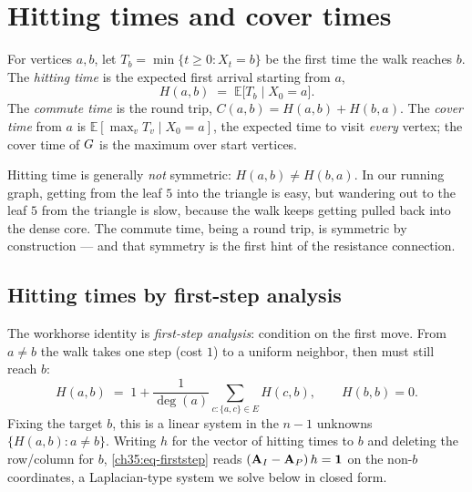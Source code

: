 \section{Hitting times and cover times}

\begin{definition}\label{ch35:def-hitting}
For vertices $a,b$, let $T_b=\min\{t\ge 0: X_t=b\}$ be the first time the walk reaches $b$. The \emph{hitting time} is the expected first arrival starting from $a$,
\[
  H(a,b)\;=\;\mathbb{E}\big[T_b \mid X_0=a\big].
\]
The \emph{commute time} is the round trip, $C(a,b)=H(a,b)+H(b,a)$. The \emph{cover time} from $a$ is $\mathbb{E}[\max_{v}T_v\mid X_0=a]$, the expected time to visit \emph{every} vertex; the cover time of $G$ is the maximum over start vertices.
\end{definition}

Hitting time is generally \emph{not} symmetric: $H(a,b)\ne H(b,a)$. In our running graph, getting from the leaf $5$ into the triangle is easy, but wandering out to the leaf $5$ from the triangle is slow, because the walk keeps getting pulled back into the dense core. The commute time, being a round trip, is symmetric by construction --- and that symmetry is the first hint of the resistance connection.

\subsection{Hitting times by first-step analysis}

The workhorse identity is \emph{first-step analysis}: condition on the first move. From $a\ne b$ the walk takes one step (cost $1$) to a uniform neighbor, then must still reach $b$:
\begin{equation}\label{ch35:eq-firststep}
  H(a,b) \;=\; 1+\frac{1}{\deg(a)}\sum_{c:\{a,c\}\in E} H(c,b),
  \qquad H(b,b)=0.
\end{equation}
Fixing the target $b$, this is a linear system in the $n-1$ unknowns $\{H(a,b):a\ne b\}$. Writing $h$ for the vector of hitting times to $b$ and deleting the row/column for $b$, \eqref{ch35:eq-firststep} reads $(\mathbf{A}_I-\mathbf{A}_P)\,h=\mathbf{1}$ on the non-$b$ coordinates, a Laplacian-type system we solve below in closed form.

